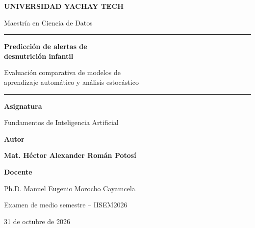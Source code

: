 ﻿\documentclass[11pt,a4paper]{article}
\begin{document}

\begin{titlepage}
\centering
\vspace*{1.5cm}

{\Large\bfseries UNIVERSIDAD YACHAY TECH\par}
\vspace{0.3cm}
{\large Maestría en Ciencia de Datos\par}

\vspace{1.2cm}
\textcolor{azul}{\rule{\textwidth}{1.5pt}}

\vspace{0.8cm}
{\Huge\bfseries
Predicción de alertas de\\[0.2cm]
desnutrición infantil\par}

\vspace{0.5cm}
{\Large
Evaluación comparativa de modelos de\\
aprendizaje automático y análisis estocástico\par}

\vspace{0.8cm}
\textcolor{azul}{\rule{\textwidth}{1.5pt}}

\vspace{1.4cm}

{\large\textbf{Asignatura}\par}
{\large Fundamentos de Inteligencia Artificial\par}

\vspace{0.8cm}

{\large\textbf{Autor}\par}
{\Large\bfseries Mat. Héctor Alexander Román Potosí\par}

\vspace{0.8cm}

{\large\textbf{Docente}\par}
{\large Ph.D. Manuel Eugenio Morocho Cayamcela\par}

\vfill

{\large Examen de medio semestre -- IISEM2026\par}
{\large 31 de octubre de 2026\par}

\end{titlepage}
\end{document}
